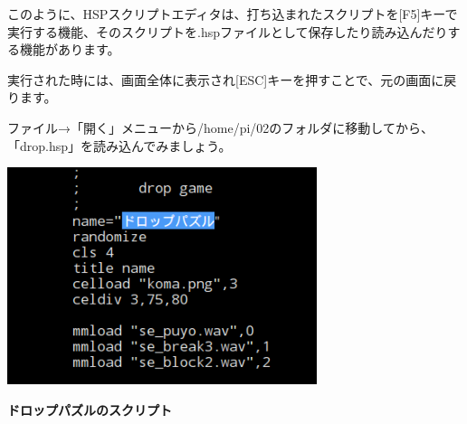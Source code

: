 \documentclass[a4paper,dvipdfmx]{jarticle}
\newcommand\textstyleqwerty[1]{#1}
\begin{document}
\bigskip

このように、HSPスクリプトエディタは、打ち込まれたスクリプトを[F5]キーで実行する機能、そのスクリプトを.hspファイルとして保存したり読み込んだりする機能があります。

実行された時には、画面全体に表示され[ESC]キーを押すことで、元の画面に戻ります。


\bigskip

ファイル→「開く」メニューから/home/pi/02のフォルダに移動してから、「drop.hsp」を読み込んでみましょう。



\begin{center}
\includegraphics[width=9.049cm,height=6.346cm]{text02-img/text02-img014.png}

\end{center}

\bigskip


\bigskip


\bigskip


\bigskip


\bigskip


\bigskip


\bigskip


\bigskip


\bigskip


\bigskip


\bigskip


\bigskip

\textstyleqwerty{\textbf{ドロップパズルのスクリプト}}


\bigskip


\bigskip


\bigskip


\bigskip


\bigskip


\bigskip


\bigskip
\end{document}
